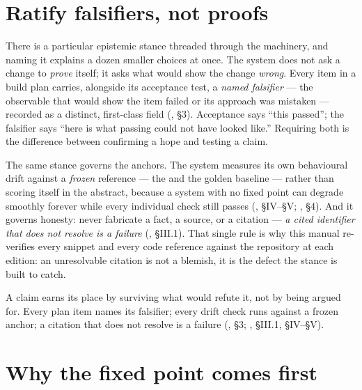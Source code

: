 \section{Ratify falsifiers, not proofs}
\label{sec:falsifiers}

There is a particular epistemic stance threaded through the machinery, and naming
it explains a dozen smaller choices at once. The system does not ask a change to
\emph{prove} itself; it asks what would show the change \emph{wrong}. Every item in
a build plan carries, alongside its acceptance test, a \emph{named falsifier} --- the
observable that would show the item failed or its approach was mistaken --- recorded
as a distinct, first-class field (, \S 3). Acceptance
says ``this passed''; the falsifier says ``here is what passing could not have
looked like.'' Requiring both is the difference between confirming a hope and
testing a claim.

The same stance governs the anchors. The system measures its own behavioural drift
against a \emph{frozen} reference --- the \Constitution{} and the golden baseline
--- rather than scoring itself in the abstract, because a system with no fixed point
can degrade smoothly forever while every individual check still passes
(, \S IV--\S V;
, \S 4). And it governs honesty: never
fabricate a fact, a source, or a citation --- \emph{a cited identifier that does not
resolve is a failure} (, \S III.1). That single
rule is why this manual re-verifies every snippet and every code reference against
the repository at each edition: an unresolvable citation is not a blemish, it is the
defect the stance is built to catch.

\begin{principle}
A claim earns its place by surviving what would refute it, not by being argued for.
Every plan item names its falsifier; every drift check runs against a frozen anchor;
a citation that does not resolve is a failure (, \S 3;
, \S III.1, \S IV--\S V).
\end{principle}

\section{Why the fixed point comes first}
\label{sec:fixed-point}

